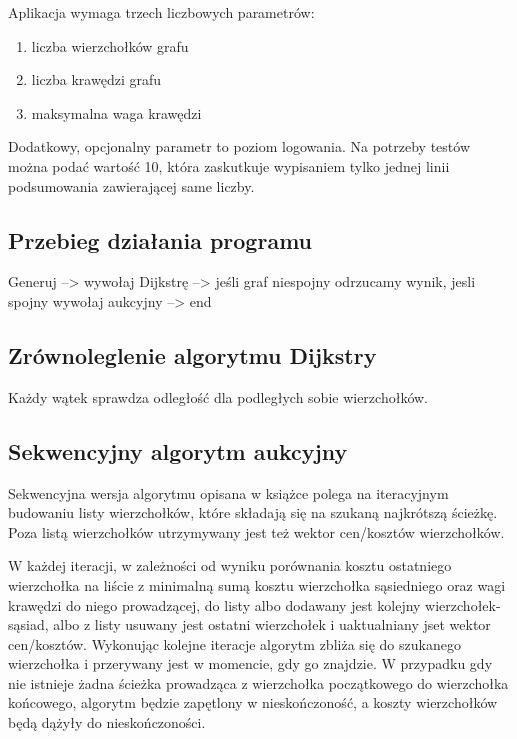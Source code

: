 \documentclass {article}
\begin{document}
Aplikacja wymaga trzech liczbowych parametrów:

\begin{enumerate}
 \item liczba wierzchołków grafu
 \item liczba krawędzi grafu
 \item maksymalna waga krawędzi
\end{enumerate}

Dodatkowy, opcjonalny parametr to poziom logowania. Na potrzeby testów można podać wartość 10, która zaskutkuje wypisaniem tylko jednej linii podsumowania zawierającej same liczby.

\subsection{Przebieg działania programu}

Generuj --> wywołaj Dijkstrę --> jeśli graf niespojny odrzucamy wynik, jesli spojny wywołaj aukcyjny --> end

\subsection{Zrównoleglenie algorytmu Dijkstry}

Każdy wątek sprawdza odległość dla podległych sobie wierzchołków.

\subsection{Sekwencyjny algorytm aukcyjny}

Sekwencyjna wersja algorytmu opisana w książce \cite{Bertsekas1998} polega na iteracyjnym budowaniu listy wierzchołków, które składają się na szukaną najkrótszą ścieżkę. Poza listą wierzchołków utrzymywany jest też wektor cen/kosztów wierzchołków.

W każdej iteracji, w zależności od wyniku porównania kosztu ostatniego wierzchołka na liście z minimalną sumą kosztu wierzchołka sąsiedniego oraz wagi krawędzi do niego prowadzącej, do listy albo dodawany jest kolejny wierzchołek-sąsiad, albo z listy usuwany jest ostatni wierzchołek i uaktualniany jset wektor cen/kosztów. Wykonując kolejne iteracje algorytm zbliża się do szukanego wierzchołka i przerywany jest w momencie, gdy go znajdzie. W przypadku gdy nie istnieje żadna ścieżka prowadząca z wierzchołka początkowego do wierzchołka końcowego, algorytm będzie zapętlony w nieskończoność, a koszty wierzchołków będą dążyły do nieskończoności.
\end{document}
